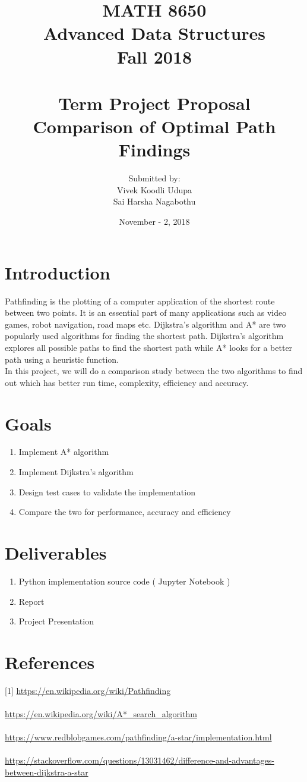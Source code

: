 \documentclass[12pt]{article}
\title{MATH 8650 \\ Advanced Data Structures \\ Fall 2018\\ \quad \\
	Term Project Proposal \\ Comparison of Optimal Path Findings}
\author{Submitted by: 
\\ Vivek Koodli Udupa 
\\ Sai Harsha Nagabothu}
\date{November - 2, 2018 }
\begin{document}
\begin{mdframed}
\maketitle
\end{mdframed}

\section{Introduction}
Pathfinding is the plotting of a computer application of the shortest route between two points. It is an essential part of many applications such as video games, robot navigation, road maps etc. Dijkstra's algorithm and A* are two popularly used algorithms for finding the shortest path. Dijkstra's algorithm explores all possible paths to find the shortest path while A* looks for a better path using a heuristic function. \\
In this project, we will do a comparison study between the two algorithms to find out which has better run time, complexity, efficiency and accuracy. 
\section{Goals}
\begin{enumerate}
	\item Implement A* algorithm
	\item Implement Dijkstra's algorithm
	\item Design test cases to validate the implementation
	\item Compare the two for performance, accuracy and efficiency
\end{enumerate}

\section{Deliverables}
\begin{enumerate}
	\item Python implementation source code ( Jupyter Notebook )
	\item Report
	\item Project Presentation
\end{enumerate}

\section{References}
[1] \url{https://en.wikipedia.org/wiki/Pathfinding} \\
\\ \noindent 
[2] \url{https://en.wikipedia.org/wiki/A*_search_algorithm} \\
\\ \noindent
[3] \url{https://www.redblobgames.com/pathfinding/a-star/implementation.html} \\
\\ \noindent
[4] \url{https://stackoverflow.com/questions/13031462/difference-and-advantages-between-dijkstra-a-star}
\end{document}
